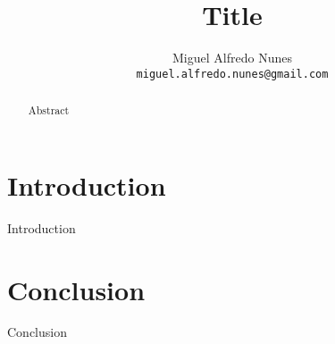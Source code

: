 \documentclass[a4paper, 12pt]{article}
\title{Title}
\author{Miguel Alfredo Nunes \\ \small{\texttt{miguel.alfredo.nunes@gmail.com}}}
\date{}
\begin{document}
	\maketitle

	\begin{abstract}
		Abstract
	\end{abstract}

	\section{Introduction}
		\label{sec:introduction}
		Introduction

	\section{Conclusion}
		\label{sec:conclusion}
		Conclusion

	
\end{document}
